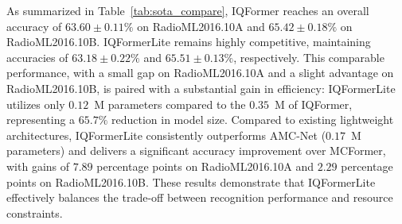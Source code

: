 \documentclass{article}
\begin{document}
	As summarized in Table~\ref{tab:sota_compare}, IQFormer reaches an overall accuracy of $63.60 \pm 0.11\%$ on RadioML2016.10A and $65.42 \pm 0.18\%$ on RadioML2016.10B. IQFormerLite remains highly competitive, maintaining accuracies of $63.18 \pm 0.22\%$ and $65.51 \pm 0.13\%$, respectively. This comparable performance, with a small gap on RadioML2016.10A and a slight advantage on RadioML2016.10B, is paired with a substantial gain in efficiency: IQFormerLite utilizes only $0.12$~M parameters compared to the $0.35$~M of IQFormer, representing a $65.7\%$ reduction in model size. Compared to existing lightweight architectures, IQFormerLite consistently outperforms AMC-Net ($0.17$~M parameters) and delivers a significant accuracy improvement over MCFormer, with gains of $7.89$ percentage points on RadioML2016.10A and $2.29$ percentage points on RadioML2016.10B. These results demonstrate that IQFormerLite effectively balances the trade-off between recognition performance and resource constraints.
\end{document}
